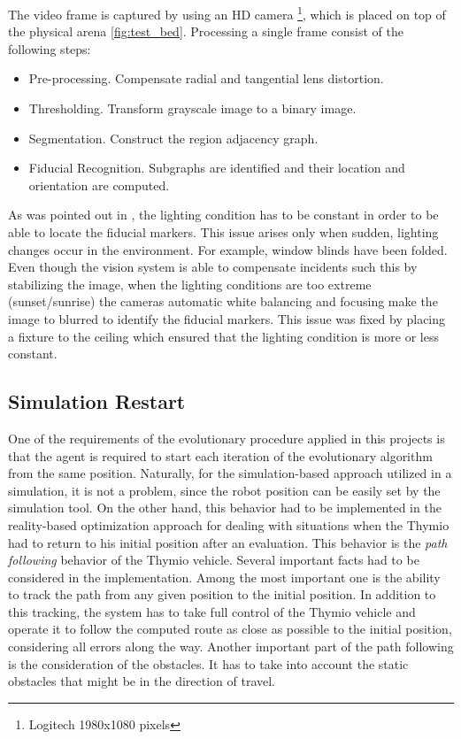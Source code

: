 The video frame is captured by using an HD camera \footnote{Logitech 1980x1080 pixels}, which is placed on top of the physical arena \ref{fig:test_bed}. Processing a single frame consist of the following steps: 

\begin{itemize}
  \item Pre-processing. Compensate radial and tangential lens distortion.
  \item Thresholding. Transform grayscale image to a binary image.
  \item Segmentation. Construct the region adjacency graph.
  \item Fiducial Recognition. Subgraphs are identified and their location and orientation are computed.   
\end{itemize}

As was pointed out in \cite{faina2017automating}, the lighting condition has to be constant in order to be able to locate the fiducial markers. This issue arises only when sudden, lighting changes occur in the environment. For example, window blinds have been folded. Even though the vision system is able to compensate incidents such this by stabilizing the image, when the lighting conditions are too extreme (sunset/sunrise) the cameras automatic white balancing and focusing make the image to blurred to identify the fiducial markers. This issue was fixed by placing a fixture to the ceiling which ensured that the lighting condition is more or less constant.


\subsection{Simulation Restart}

One of the requirements of the evolutionary procedure applied in this projects is that the agent is required to start each iteration of the evolutionary algorithm from the same position. Naturally, for the simulation-based approach utilized in a simulation, it is not a problem, since the robot position can be easily set by the simulation tool. On the other hand, this behavior had to be implemented in the reality-based optimization approach for dealing with situations when the Thymio had to return to his initial position after an evaluation. This behavior is the \emph{path following} behavior of the Thymio vehicle. Several important facts had to be considered in the implementation. Among the most important one is the ability to track the path from any given position to the initial position. In addition to this tracking, the system has to take full control of the Thymio vehicle and operate it to follow the computed route as close as possible to the initial position, considering all errors along the way. Another important part of the path following is the consideration of the obstacles. It has to take into account the static obstacles that might be in the direction of travel.

